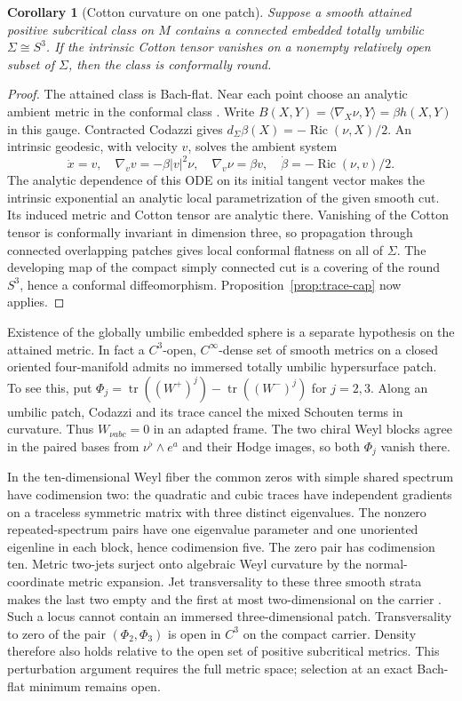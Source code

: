 \documentclass[11pt,letterpaper]{article}
\numberwithin{equation}{section}
\newtheorem{corollary}[theorem]{Corollary}
\DeclareMathOperator{\Ric}{Ric}
\begin{document}
\begin{corollary}[Cotton curvature on one patch]
\label{cor:cotton-open-patch}
Suppose a smooth attained positive subcritical class on \(M\) contains
a connected embedded totally umbilic \(\Sigma\cong S^3\). If the
intrinsic Cotton tensor vanishes on a nonempty relatively open subset
of \(\Sigma\), then the class is conformally round.
\end{corollary}
\begin{proof}
The attained class is Bach-flat. Near each point choose an analytic
ambient metric in the conformal class
\cite[Theorem 3.7(c)]{LassasLiimatainen2019ConformalHarmonic}.
Write \(B(X,Y)=\langle\nabla_X\nu,Y\rangle=\beta h(X,Y)\) in this
gauge. Contracted Codazzi gives
\(d_\Sigma\beta(X)=-\Ric(\nu,X)/2\).
An intrinsic geodesic, with velocity \(v\), solves the ambient system
\[
 \dot x=v,\quad \nabla_v v=-\beta|v|^2\nu,\quad
 \nabla_v\nu=\beta v,\quad \dot\beta=-\Ric(\nu,v)/2 .
\]
The analytic dependence of this ODE on its initial tangent vector
makes the intrinsic exponential an analytic local parametrization of
the given smooth cut. Its induced metric and Cotton tensor are analytic
there. Vanishing of the Cotton tensor is conformally invariant in
dimension three, so propagation through connected overlapping patches
gives local conformal flatness on all of \(\Sigma\). The developing
map of the compact simply connected cut is a covering of the round
\(S^3\), hence a conformal diffeomorphism.
Proposition~\ref{prop:trace-cap} now applies.
\end{proof}
Existence of the globally umbilic embedded sphere is a separate
hypothesis on the attained metric. In fact a \(C^3\)-open,
\(C^\infty\)-dense set of smooth metrics on a closed oriented
four-manifold admits no immersed totally umbilic hypersurface patch.
To see this, put \(\Phi_j=\operatorname{tr}((W^+)^j)
-\operatorname{tr}((W^-)^j)\) for \(j=2,3\).
Along an umbilic patch, Codazzi and its trace cancel the mixed
Schouten terms in curvature. Thus \(W_{\nu abc}=0\) in an adapted
frame. The two chiral Weyl blocks agree in the paired bases from
\(\nu^\flat\wedge e^a\) and their Hodge images, so both \(\Phi_j\)
vanish there.

In the ten-dimensional Weyl fiber the common zeros with simple shared
spectrum have codimension two: the quadratic and cubic traces have
independent gradients on a traceless symmetric matrix with three
distinct eigenvalues. The nonzero repeated-spectrum pairs have one
eigenvalue parameter and one unoriented eigenline in each block, hence
codimension five. The zero pair has codimension ten. Metric two-jets
surject onto algebraic Weyl curvature by the normal-coordinate metric
expansion. Jet transversality to these three smooth strata makes the
last two empty and the first at most two-dimensional on the carrier
\cite[Theorem (1.5)]{Boardman1967Singularities}. Such a locus cannot
contain an immersed three-dimensional patch. Transversality to zero
of the pair \((\Phi_2,\Phi_3)\) is open in \(C^3\) on the compact
carrier. Density therefore also holds relative to the open set of
positive subcritical metrics. This perturbation argument requires the
full metric space; selection at an exact Bach-flat minimum remains
open.
\end{document}
